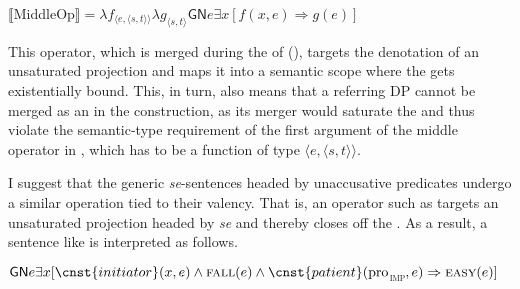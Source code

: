 \documentclass[output=paper,nonflat,newtxmath]{langsci/langscibook}
\begin{document}
\begin{exe}
\ex \label{ex:lenardic: 35} $\llbracket$MiddleOp$\rrbracket = \lambda f_{\langle e,\langle s,t\rangle\rangle}\lambda g_{\langle s,t\rangle}\textsf{GN}e\exists x[f(x, e) \Rightarrow g(e)]$
\end{exe}


\noindent This operator, which is merged during the  of  (\citealt{bruening2012}), targets the denotation of an unsaturated  projection and maps it into a semantic scope where the   gets existentially bound. This, in turn, also means that a referring DP cannot be merged as an  in the  construction, as its merger would saturate the  and thus violate the semantic-type requirement of the first argument of the middle operator in , which has to be a function of type $\langle e,\langle s,t\rangle\rangle$.

I suggest that the generic \textit{se}-sentences headed by unaccusative predicates undergo a similar operation tied to their valency. That is, an operator such as  targets an unsaturated  projection headed by \textit{se} and thereby closes off the . As a result, a sentence like  is interpreted as follows.

\begin{exe}
\ex \label{ex:lenardic: 36} $\textsf{GN}e\exists x[\cnst{initiator}(x, e) \land \textsc{fall}(e) \land \cnst{patient}(\mbox{pro}$\textsubscript{\textsc{imp}}$, e) \Rightarrow \textsc{easy}(e)]$
\end{exe}
\end{document}
